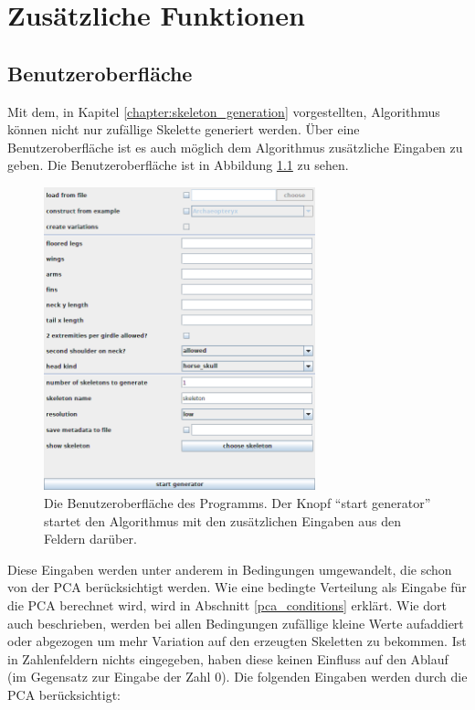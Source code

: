 \chapter{Zusätzliche Funktionen}
\label{chapter:additional_features}


\section{Benutzeroberfläche}
\label{gui}

Mit dem, in Kapitel \ref{chapter:skeleton_generation} vorgestellten, Algorithmus können nicht nur zufällige Skelette generiert werden. Über eine Benutzeroberfläche ist es auch möglich dem Algorithmus zusätzliche Eingaben zu geben. Die Benutzeroberfläche ist in Abbildung \ref{gui_screenshot} zu sehen.

\begin{figure}
 \centering
 \includegraphics[width=0.7\textwidth]{graphics/gui.png}
 \caption{Die Benutzeroberfläche des Programms. Der Knopf "`start generator"' startet den Algorithmus mit den zusätzlichen Eingaben aus den Feldern darüber.}
 \label{gui_screenshot}
\end{figure}

Diese Eingaben werden unter anderem in Bedingungen umgewandelt, die schon von der PCA berücksichtigt werden. Wie eine bedingte Verteilung als Eingabe für die PCA berechnet wird, wird in Abschnitt \ref{pca_conditions} erklärt. Wie dort auch beschrieben, werden bei allen Bedingungen zufällige kleine Werte aufaddiert oder abgezogen um mehr Variation auf den erzeugten Skeletten zu bekommen.
Ist in Zahlenfeldern nichts eingegeben, haben diese keinen Einfluss auf den Ablauf (im Gegensatz zur Eingabe der Zahl $0$). Die folgenden Eingaben werden durch die PCA berücksichtigt:

